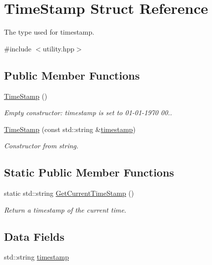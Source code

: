 \hypertarget{structTimeStamp}{}\section{Time\+Stamp Struct Reference}
\label{structTimeStamp}


The type used for timestamp.  




{\ttfamily \#include $<$utility.\+hpp$>$}

\subsection*{Public Member Functions}
\begin{DoxyCompactItemize}
\item 
\hyperlink{structTimeStamp_a130d6c5230be88ae97c3db1ca9362b97}{Time\+Stamp} ()
\begin{DoxyCompactList}\small\item\em Empty constructor\+: timestamp is set to 01-\/01-\/1970 00.. \end{DoxyCompactList}\item 
\hyperlink{structTimeStamp_a30bbacb4047491f083621cf2f3bf1d2e}{Time\+Stamp} (const std\+::string \&\hyperlink{structTimeStamp_aabadfe55a07e911a3a255fb59cfff993}{timestamp})
\begin{DoxyCompactList}\small\item\em Constructor from string. \end{DoxyCompactList}\end{DoxyCompactItemize}
\subsection*{Static Public Member Functions}
\begin{DoxyCompactItemize}
\item 
static std\+::string \hyperlink{structTimeStamp_af05020c48d0889c76d9717a88a6b75b9}{Get\+Current\+Time\+Stamp} ()
\begin{DoxyCompactList}\small\item\em Return a timestamp of the current time. \end{DoxyCompactList}\end{DoxyCompactItemize}
\subsection*{Data Fields}
\begin{DoxyCompactItemize}
\item 
std\+::string \hyperlink{structTimeStamp_aabadfe55a07e911a3a255fb59cfff993}{timestamp}
\end{DoxyCompactItemize}
